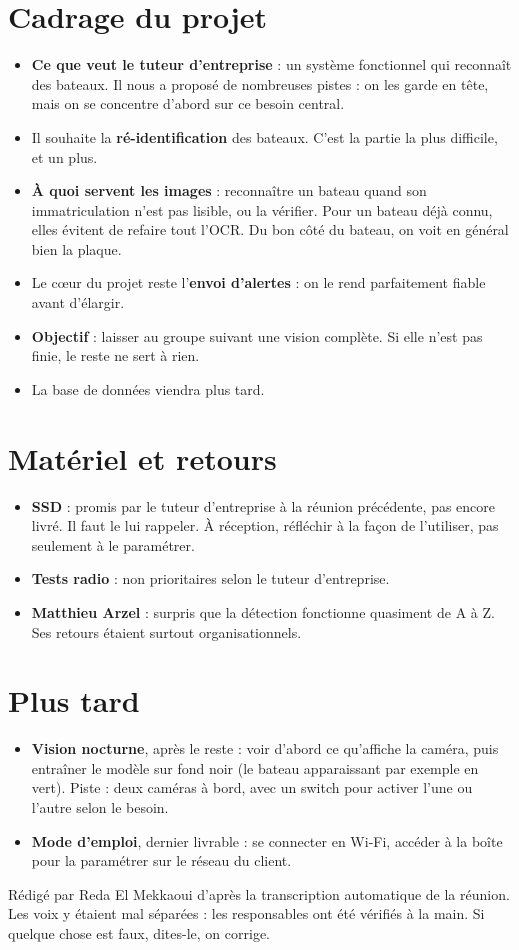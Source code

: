 \documentclass[10pt,a4paper]{article}
\begin{document}
\newpage

\section{Cadrage du projet}
\begin{itemize}
  \item \textbf{Ce que veut le tuteur d'entreprise} : un système fonctionnel qui reconnaît des bateaux. Il nous a proposé de nombreuses pistes : on les garde en tête, mais on se concentre d'abord sur ce besoin central.
  \item Il souhaite la \textbf{ré-identification} des bateaux. C'est la partie la plus difficile, et un plus.
  \item \textbf{À quoi servent les images} : reconnaître un bateau quand son immatriculation n'est pas lisible, ou la vérifier. Pour un bateau déjà connu, elles évitent de refaire tout l'OCR. Du bon côté du bateau, on voit en général bien la plaque.
  \item Le cœur du projet reste l'\textbf{envoi d'alertes} : on le rend parfaitement fiable avant d'élargir.
  \item \textbf{Objectif} : laisser au groupe suivant une vision complète. Si elle n'est pas finie, le reste ne sert à rien.
  \item La base de données viendra plus tard.
\end{itemize}

\section{Matériel et retours}
\begin{itemize}
  \item \textbf{SSD} : promis par le tuteur d'entreprise à la réunion précédente, pas encore livré. Il faut le lui rappeler. À réception, réfléchir à la façon de l'utiliser, pas seulement à le paramétrer.
  \item \textbf{Tests radio} : non prioritaires selon le tuteur d'entreprise.
  \item \textbf{Matthieu Arzel} : surpris que la détection fonctionne quasiment de A à Z. Ses retours étaient surtout organisationnels.
\end{itemize}

\section{Plus tard}
\begin{itemize}
  \item \textbf{Vision nocturne}, après le reste : voir d'abord ce qu'affiche la caméra, puis entraîner le modèle sur fond noir (le bateau apparaissant par exemple en vert). Piste : deux caméras à bord, avec un switch pour activer l'une ou l'autre selon le besoin.
  \item \textbf{Mode d'emploi}, dernier livrable : se connecter en Wi-Fi, accéder à la boîte pour la paramétrer sur le réseau du client.
\end{itemize}

\vfill
{\footnotesize\color{muted} Rédigé par Reda El Mekkaoui d'après la transcription automatique de la réunion. Les voix y étaient mal séparées : les responsables ont été vérifiés à la main. Si quelque chose est faux, dites-le, on corrige.\par}
\end{document}
